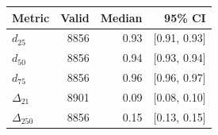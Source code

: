 \begin{tabular}{@{}lrrr@{}}
\toprule
\textbf{Metric} & \textbf{Valid} & \textbf{Median} & \textbf{95\% CI} \\
\midrule
$d_{25}$ & 8856 & 0.93 & [0.91, 0.93] \\
$d_{50}$ & 8856 & 0.94 & [0.93, 0.94] \\
$d_{75}$ & 8856 & 0.96 & [0.96, 0.97] \\
$\Delta_{21}$ & 8901 & 0.09 & [0.08, 0.10] \\
$\Delta_{250}$ & 8856 & 0.15 & [0.13, 0.15] \\
\bottomrule
\end{tabular}
